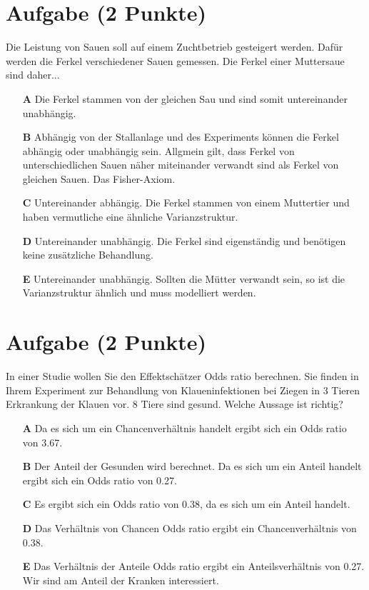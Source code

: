 \documentclass[a4paper, 9pt]{scrartcl}\usepackage[]{graphicx}\usepackage[]{xcolor}
\begin{document}
\section{Aufgabe \hfill (2 Punkte)}



Die Leistung von Sauen soll auf einem Zuchtbetrieb gesteigert werden. Dafür werden die Ferkel verschiedener Sauen gemessen. Die Ferkel einer Muttersaue sind daher...



\begin{enumerate}
\item [\textbf{A} \msquare] Die Ferkel stammen von der gleichen Sau und sind somit untereinander unabhängig.
\item [\textbf{B} \msquare] Abhängig von der Stallanlage und des Experiments können die Ferkel abhängig oder unabhängig sein. Allgmein gilt, dass Ferkel von unterschiedlichen Sauen näher miteinander verwandt sind als Ferkel von gleichen Sauen. Das Fisher-Axiom.
\item [\textbf{C} \msquare] Untereinander abhängig. Die Ferkel stammen von einem Muttertier und haben vermutliche eine ähnliche Varianzstruktur.
\item [\textbf{D} \msquare] Untereinander unabhängig. Die Ferkel sind eigenständig und benötigen keine zusätzliche Behandlung.
\item [\textbf{E} \msquare] Untereinander unabhängig. Sollten die Mütter verwandt sein, so ist die Varianzstruktur ähnlich und muss modelliert werden.
\end{enumerate}

\section{Aufgabe \hfill (2 Punkte)}



In einer Studie wollen Sie den Effektschätzer Odds ratio berechnen. Sie finden in Ihrem Experiment zur Behandlung von Klaueninfektionen bei Ziegen in 3 Tieren Erkrankung der Klauen vor. 8 Tiere sind gesund. Welche Aussage ist richtig?



\begin{enumerate}
\item [\textbf{A} \msquare] Da es sich um ein Chancenverhältnis handelt ergibt sich ein Odds ratio von 3.67.
\item [\textbf{B} \msquare] Der Anteil der Gesunden wird berechnet. Da es sich um ein Anteil handelt ergibt sich ein Odds ratio von 0.27.
\item [\textbf{C} \msquare] Es ergibt sich ein Odds ratio von 0.38, da es sich um ein Anteil handelt.
\item [\textbf{D} \msquare] Das Verhältnis von Chancen Odds ratio ergibt ein Chancenverhältnis von 0.38.
\item [\textbf{E} \msquare] Das Verhältnis der Anteile Odds ratio ergibt ein Anteilsverhältnis von 0.27. Wir sind am Anteil der Kranken interessiert.
\end{enumerate}
\end{document}
